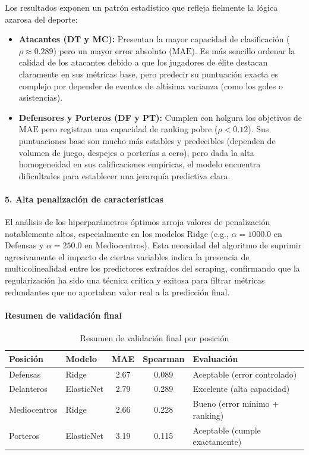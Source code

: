 Los resultados exponen un patrón estadístico que refleja fielmente la 
lógica azarosa del deporte:
\begin{itemize}
  \item \textbf{Atacantes (DT y MC):} Presentan la mayor capacidad de 
        clasificación ($\rho \approx 0.289$) pero un mayor error absoluto 
        ($\mathrm{MAE}$). Es más sencillo ordenar la calidad de los atacantes 
        debido a que los jugadores de élite destacan claramente en sus 
        métricas base, pero predecir su puntuación exacta es complejo por 
        depender de eventos de altísima varianza (como los goles o asistencias).
  \item \textbf{Defensores y Porteros (DF y PT):} Cumplen con holgura los 
        objetivos de $\mathrm{MAE}$ pero registran una capacidad de ranking pobre 
        ($\rho < 0.12$). Sus puntuaciones base son mucho más estables y predecibles 
        (dependen de volumen de juego, despejes o porterías a cero), pero dada 
        la alta homogeneidad en sus calificaciones empíricas, el modelo 
        encuentra dificultades para establecer una jerarquía predictiva clara.
\end{itemize}

\paragraph{5. Alta penalización de características}

El análisis de los hiperparámetros óptimos arroja valores de penalización 
notablemente altos, especialmente en los modelos Ridge (e.g., $\alpha=1000.0$ 
en Defensas y $\alpha=250.0$ en Mediocentros). Esta necesidad del algoritmo 
de suprimir agresivamente el impacto de ciertas variables indica la presencia 
de multicolinealidad entre los predictores extraídos del scraping, confirmando 
que la regularización ha sido una técnica crítica y exitosa para filtrar métricas 
redundantes que no aportaban valor real a la predicción final.

\paragraph{Resumen de validación final}

\begin{table}[H]
\centering
\small
\begin{tabular}{|l|l|c|c|p{4cm}|}
\hline
\textbf{Posición} & \textbf{Modelo} & \textbf{MAE} & 
\textbf{Spearman} & \textbf{Evaluación} \\
\hline
Defensas & Ridge & 2.67 & 0.089 & Aceptable (error 
controlado) \\
Delanteros & ElasticNet & 2.79 & 0.289 & Excelente (alta 
capacidad) \\
Mediocentros & Ridge & 2.66 & 0.228 & Bueno (error mínimo + 
ranking) \\
Porteros & ElasticNet & 3.19 & 0.115 & Aceptable (cumple 
exactamente) \\
\hline
\end{tabular}
\caption{Resumen de validación final por posición}
\end{table}


